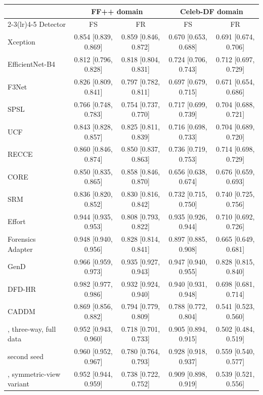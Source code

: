 \begin{tabular}{@{}l cccc@{}}
\toprule
 & \multicolumn{2}{c}{FF++ domain} & \multicolumn{2}{c}{Celeb-DF domain} \\
\cmidrule(lr){2-3}\cmidrule(lr){4-5}
Detector & FS & FR & FS & FR \\
\midrule
Xception & 0.854 [0.839, 0.869] & 0.859 [0.846, 0.872] & 0.670 [0.653, 0.688] & 0.691 [0.674, 0.706] \\
EfficientNet-B4 & 0.812 [0.796, 0.828] & 0.818 [0.804, 0.831] & 0.724 [0.706, 0.743] & 0.712 [0.697, 0.729] \\
F3Net & 0.826 [0.809, 0.841] & 0.797 [0.782, 0.811] & 0.697 [0.679, 0.715] & 0.671 [0.654, 0.686] \\
SPSL & 0.766 [0.748, 0.783] & 0.754 [0.737, 0.770] & 0.717 [0.699, 0.739] & 0.704 [0.688, 0.721] \\
UCF & 0.843 [0.828, 0.857] & 0.825 [0.811, 0.839] & 0.716 [0.698, 0.733] & 0.704 [0.689, 0.720] \\
RECCE & 0.860 [0.846, 0.874] & 0.850 [0.837, 0.863] & 0.736 [0.719, 0.753] & 0.714 [0.698, 0.729] \\
CORE & 0.850 [0.835, 0.865] & 0.858 [0.846, 0.870] & 0.656 [0.638, 0.674] & 0.676 [0.659, 0.693] \\
SRM & 0.836 [0.820, 0.852] & 0.830 [0.816, 0.842] & 0.732 [0.715, 0.750] & 0.740 [0.725, 0.756] \\
Effort~\cite{effort} & 0.944 [0.935, 0.953] & 0.808 [0.793, 0.822] & 0.935 [0.926, 0.944] & 0.710 [0.692, 0.726] \\
Forensics Adapter~\cite{forensicsadapter} & 0.948 [0.940, 0.956] & 0.828 [0.814, 0.841] & 0.897 [0.885, 0.908] & 0.665 [0.649, 0.681] \\
GenD~\cite{gend2026} & 0.966 [0.959, 0.973] & 0.935 [0.927, 0.943] & 0.947 [0.940, 0.955] & 0.828 [0.815, 0.840] \\
DFD-HR~\cite{dfdhr2026} & 0.982 [0.977, 0.986] & 0.932 [0.924, 0.940] & 0.940 [0.931, 0.948] & 0.698 [0.681, 0.714] \\
CADDM~\cite{caddm} & 0.869 [0.856, 0.882] & 0.794 [0.779, 0.809] & 0.788 [0.772, 0.804] & 0.541 [0.523, 0.560] \\
\midrule
\ours{}, three-way, full data & 0.952 [0.943, 0.960] & 0.718 [0.701, 0.733] & 0.905 [0.894, 0.915] & 0.502 [0.484, 0.519] \\
\quad second seed & 0.960 [0.952, 0.967] & 0.780 [0.764, 0.793] & 0.928 [0.918, 0.937] & 0.559 [0.540, 0.577] \\
\ours{}, symmetric-view variant & 0.952 [0.944, 0.959] & 0.738 [0.722, 0.752] & 0.909 [0.898, 0.919] & 0.539 [0.521, 0.556] \\

\end{tabular}
